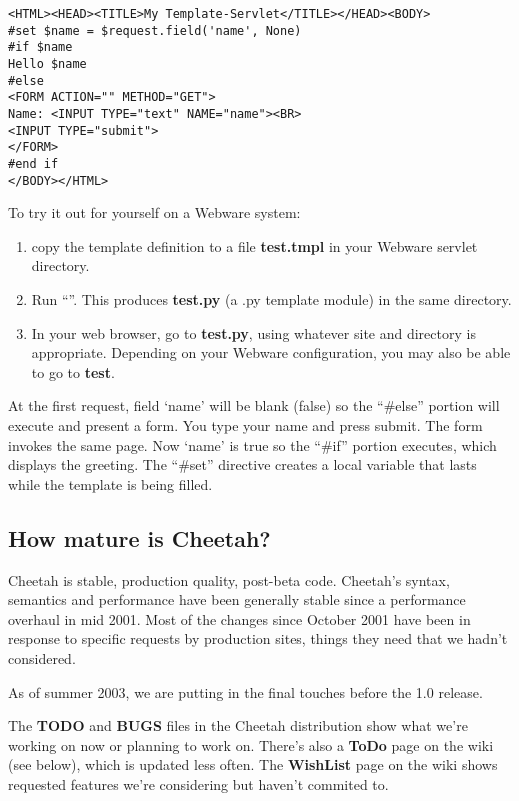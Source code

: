\begin{verbatim}
<HTML><HEAD><TITLE>My Template-Servlet</TITLE></HEAD><BODY>   
#set $name = $request.field('name', None)
#if $name  
Hello $name
#else
<FORM ACTION="" METHOD="GET">
Name: <INPUT TYPE="text" NAME="name"><BR>
<INPUT TYPE="submit">
</FORM>
#end if
</BODY></HTML>
\end{verbatim}

To try it out for yourself on a Webware system:
\begin{enumerate}
\item copy the template definition to a file {\bf test.tmpl} in your
    Webware servlet directory.
\item Run ``''.  This produces
    {\bf test.py} (a .py template module) in the same directory.
\item In your web browser, go to {\bf test.py}, using whatever site and
    directory is appropriate.  Depending on your Webware configuration, you may
    also be able to go to {\bf test}.
\end{enumerate}

At the first request, field `name' will be blank (false) so the ``\#else''
portion will execute and present a form.  You type your name and press submit.
The form invokes the same page.  Now `name' is true so the ``\#if'' portion
executes, which displays the greeting.  The ``\#set'' directive creates a
local variable that lasts while the template is being filled.


\subsection{How mature is Cheetah?}
\label{intro.mature}

Cheetah is stable, production quality, post-beta code. Cheetah's syntax,
semantics and performance have been generally stable since a performance
overhaul in mid 2001. Most of the changes since October 2001 have
been in response to specific requests by production sites, things they need that
we hadn't considered.

As of summer 2003, we are putting in the final touches before the 1.0 release.

The {\bf TODO} and {\bf BUGS} files in the Cheetah distribution show what we're
working on now or planning to work on.  There's also a {\bf ToDo} page on the
wiki (see below), which is updated less often.  The {\bf WishList} page on the
wiki shows requested features we're considering but haven't commited to.

